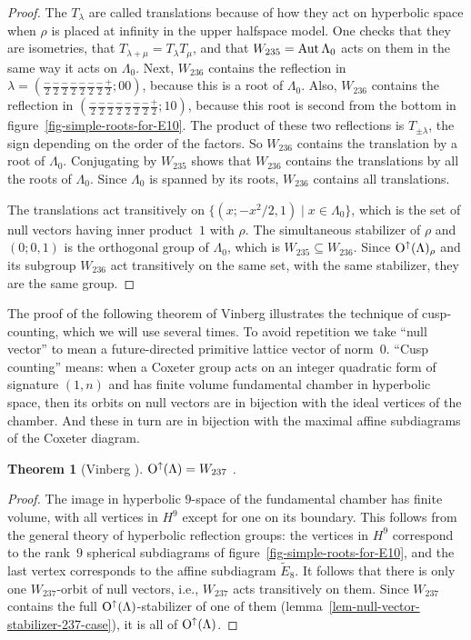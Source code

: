 \documentclass[12pt]{amsart}
\def\Aut{\mathop{\rm Aut}\nolimits}
\def\Orth{{\rm O}}
\def\Oup{\Orth^{\uparrow}}
\def\Etilde{\widetilde{E}}
\def\sset{\subseteq}
\def\set#1#2{\{#1\mid#2\}}
\newtheorem{theorem}{Theorem}
\numberwithin{theorem}{section}
\numberwithin{equation}{section}
\numberwithin{figure}{section}
\theoremstyle{remark}
\begin{document}
\begin{proof}
The $T_\lambda$ are called translations because of how they act on
hyperbolic space when $\rho$ is placed at infinity in the upper
halfspace model.  One checks that they are isometries, that
$T_{\lambda+\mu}=T_\lambda T_\mu$, and that $W_{235}=\Aut\Lambda_0$
acts on them in the same way it acts on $\Lambda_0$.
Next, $W_{236}$ contains the reflection in
$\lambda=(\frac-2\frac-2\frac-2\frac-2\frac-2\frac-2\frac-2\frac+2;00)$,
because this is a root of $\Lambda_0$.  Also, $W_{236}$ contains the
reflection in
$(\frac-2\frac-2\frac-2\frac-2\frac-2\frac-2\frac-2\frac+2;10)$,
because this root is second from the bottom in figure~\ref{fig-simple-roots-for-E10}.  The product of
these two reflections is $T_{\pm\lambda}$, the sign depending on the
order of the factors.  So $W_{236}$ contains the translation by a
root of $\Lambda_0$.  Conjugating by $W_{235}$ shows that $W_{236}$
contains the translations by all the roots of $\Lambda_0$.  Since  $\Lambda_0$ is spanned by its roots, 
$W_{236}$ contains all translations.

The translations act transitively on
$\set{(x;-x^2/2,1)}{x\in\Lambda_0}$, which is the set of null vectors
having inner product~$1$ with $\rho$.
The simultaneous stabilizer of
$\rho$ and  $(0;0,1)$ is the orthogonal group of $\Lambda_0$,
which is $W_{235}\sset W_{236}$.  Since 
$\Oup(\Lambda)_\rho$  and its subgroup $W_{236}$
act transitively
on the same set, with the same stabilizer, they are the same group.
\end{proof}

The proof of the following theorem of Vinberg illustrates the
technique of cusp-counting, which we will use several times.  To avoid
repetition we take ``null vector'' to mean a future-directed
primitive lattice vector of norm~$0$.  ``Cusp counting'' means: when a
Coxeter group acts on an integer quadratic form of signature $(1,n)$
and has
finite volume fundamental chamber in hyperbolic space, then its orbits on
null vectors are in bijection with the ideal vertices of the chamber.
And these in turn are in bijection with the maximal affine subdiagrams
of the Coxeter diagram.

\begin{theorem}[Vinberg \cite{Vinberg-E10}]
\label{thm-Vinberg-237}
  $\Oup(\Lambda)=W_{237}$%
.
\end{theorem}

\begin{proof}
The image in hyperbolic $9$-space of the fundamental chamber has
finite volume, with all vertices in $H^9$ except for one on its
boundary.  This follows from the general theory of hyperbolic
reflection groups: the vertices in $H^9$ correspond to the rank~$9$
spherical subdiagrams of figure~\ref{fig-simple-roots-for-E10}, and the last vertex
corresponds to the affine  subdiagram $\Etilde_8$.  It follows that there is
only one $W_{237}$-orbit of null vectors, i.e., $W_{237}$ acts
transitively on them.  Since $W_{237}$ contains the full
$\Oup(\Lambda)$-stabilizer of one of them (lemma~\ref{lem-null-vector-stabilizer-237-case}), it is all of
$\Oup(\Lambda)$.
\end{proof}
\end{document}
